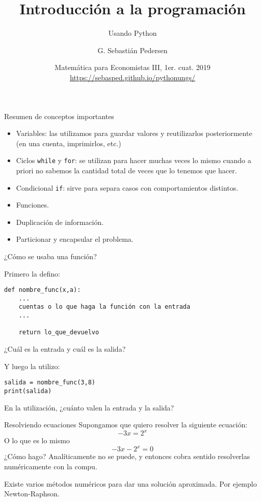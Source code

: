 \documentclass[handout,9pt]{beamer}
\title[Intro Prog] %
{Introducción a la programación}
\subtitle
{Usando Python}
\author[SP]
{G. Sebastián Pedersen}%
\institute[UNGS] %
{
  Instituto de Industria\\
  Universidad Nacional de General Sarmiento
}
\date[] %
{Matemática para Economistas III, 1er. cuat. 2019\\ 
\vspace{.5cm}
\url{https://sebasped.github.io/pythonungs/}
}
\begin{document}
\begin{frame}
  \titlepage
\end{frame}



\begin{frame}[fragile]{Resumen de conceptos importantes}
\begin{itemize}
	\item Variables: \pause las utilizamos para guardar valores y reutilizarlos posteriormente (en una cuenta, imprimirlos, etc.) \pause
	\item Ciclos \verb|while| y \verb|for|: \pause se utilizan para hacer muchas veces lo mismo cuando a priori no sabemos la cantidad total de veces que lo tenemos que hacer.\pause
	\item Condicional \verb|if|: \pause sirve para separa casos con comportamientos distintos.\pause
	\item Funciones.\pause
	\item Duplicación de información.\pause
	\item Particionar y encapsular el problema.
\end{itemize}
\end{frame}



\begin{frame}[fragile]{¿Cómo se usaba una función?}

Primero la defino:
\normalsize{\begin{verbatim}
def nombre_func(x,a):
    ...
    cuentas o lo que haga la función con la entrada
    ...
    
    return lo_que_devuelvo
\end{verbatim}}\pause
¿Cuál es la entrada y cuál es la salida?\pause
\vspace{0.5cm}

Y luego la utilizo:
\normalsize{\begin{verbatim}
salida = nombre_func(3,8)
print(salida)
\end{verbatim}}\pause
En la utilización, ¿cuánto valen la entrada y la salida?

\end{frame}



\begin{frame}[fragile]{Resolviendo ecuaciones}
Supongamos que quiero resolver la siguiente ecuación:
$$ -3x=2^x$$
O lo que es lo mismo
$$ -3x-2^x=0$$
¿Cómo hago? \pause
Analíticamente no se puede, y entonces cobra sentido resolverlas numéricamente con la compu.\pause

Existe varios métodos numéricos para dar una solución aproximada. Por ejemplo Newton-Raphson.
\end{frame}
\end{document}
